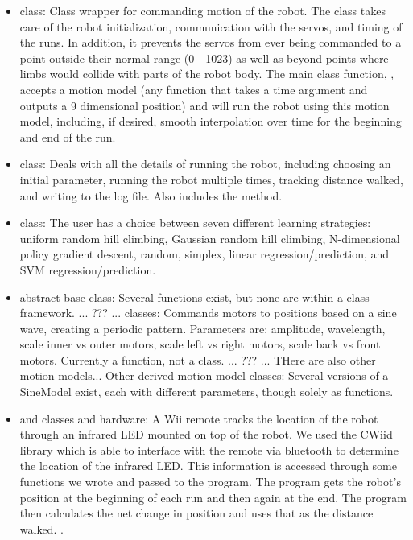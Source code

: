 \begin{itemize}

\item {} class: Class wrapper for commanding
  motion of the robot.  The  class takes care of the robot
  initialization, communication with the servos, and timing of the
  runs.  In addition, it prevents the servos from ever being commanded
  to a point outside their normal range (0 - 1023) as well as beyond
  points where limbs would collide with parts of the robot body.  The
  main class function, , accepts a motion model (any
  function that takes a time argument and outputs a 9 dimensional
  position) and will run the robot using this motion model, including,
  if desired, smooth interpolation over time for the beginning and end
  of the run.

\item {} class: Deals with all the details of running the robot,
  including choosing an initial parameter, running the robot multiple times, 
  tracking distance walked, and writing to the log file. Also includes the
   method.

\item {} class: The user has a choice between seven
  different learning strategies: uniform random hill climbing, Gaussian random
  hill climbing, N-dimensional policy gradient descent, random, 
  simplex, linear regression/prediction, and SVM regression/prediction.

\item {} abstract base class: Several functions exist,
  but none are within a class framework. ... ??? ... 
  classes: Commands motors to positions based on a sine wave, creating
  a periodic pattern. Parameters are: amplitude, wavelength, scale
  inner vs outer motors, scale left vs right motors, scale back vs
  front motors. Currently a function, not a class. ... ??? ... THere
  are also other motion models... Other derived motion model classes:
  Several versions of a SineModel exist, each with different
  parameters, though solely as functions.

\item {} and  classes and
  hardware: A Wii remote tracks the location of the robot through an
  infrared LED mounted on top of the robot. We used the CWiid library
  which is able to interface with the remote via bluetooth to
  determine the location of the infrared LED. This information is
  accessed through some functions we wrote and passed to the
  program. The program gets the robot's position at the beginning of
  each run and then again at the end. The program then calculates the
  net change in position and uses that as the distance
  walked. .

\end{itemize}

